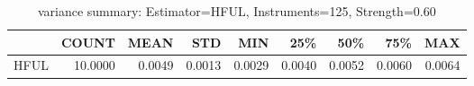 \begin{table}[ht]
\centering
\caption{variance summary: Estimator=HFUL, Instruments=125, Strength=0.60}
\begin{tabular}{lrrrrrrrr}
\toprule
 & COUNT & MEAN & STD & MIN & 25\% & 50\% & 75\% & MAX \\
\midrule
HFUL & 10.0000 & 0.0049 & 0.0013 & 0.0029 & 0.0040 & 0.0052 & 0.0060 & 0.0064 \\
\bottomrule
\end{tabular}
\end{table}

